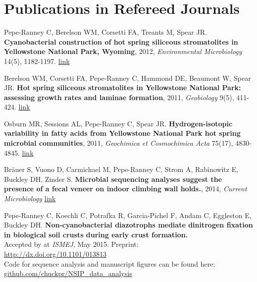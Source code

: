 \documentclass[letterpaper]{article}
\renewenvironment{itemize}{
  \begin{list}{}{
    \setlength{\leftmargin}{1.5em}
  }
}{
  \end{list}
}
\begin{document}
\section*{Publications in Refereed Journals}
\begin{itemize}
\item Pepe-Ranney C, Berelson WM, Corsetti FA, Treants M, Spear JR.
    \textbf{Cyanobacterial construction of hot spring siliceous stromatolites in
    Yellowstone National Park, Wyoming}, 2012, {\it Environmental
    Microbiology} 14(5), 1182-1197. \href{http://www.ncbi.nlm.nih.gov/pubmed/22356555}{link} 
\item Berelson WM, Corsetti FA, Pepe-Ranney C, Hammond DE, Beaumont W, Spear
    JR. \textbf{Hot spring siliceous stromatolites in Yellowstone National Park:
    assessing growth rates and laminae formation}, 2011, {\it Geobiology}
    9(5), 411-424. \href{http://www.ncbi.nlm.nih.gov/pubmed/21777367}{link}
\item Osburn MR, Sessions AL, Pepe-Ranney C, Spear JR. \textbf{Hydrogen-isotopic
    variability in fatty acids from Yellowstone National Park hot spring
    microbial communities}, 2011, {\it Geochimica et Cosmochimica Acta}
    75(17), 4830-4845.
    \href{http://www.sciencedirect.com/science/article/pii/S0016703711003152}{link}
\item Br\"{a}uer S, Vuono D, Carmichael M, Pepe-Ranney C, Strom A, Rabinowitz
    E, Buckley DH, Zinder S. \textbf{Microbial sequencing analyses suggest
    the presence of a fecal veneer on indoor climbing wall holds.}, 2014, {\it
    Current Microbiology} \href{http://www.ncbi.nlm.nih.gov/pubmed/24972665}{link}
\item Pepe-Ranney C, Koechli C, Potrafka R, Garcia-Pichel F, Andam C, Eggleston E, Buckley DH. 
    \textbf{Non-cyanobacterial diazotrophs mediate dinitrogen fixation in
        biological soil crusts during early crust formation.}\\ 
    Accepted by at \textit{ISMEJ}, May 2015. Preprint:\\ 
    \href{http://dx.doi.org/10.1101/013813}
    {http://dx.doi.org/10.1101/013813}\\
    Code for sequence analysis and manuscript figures can be found here:\\
    \href{http://www.github.com/chuckpr/NSIP_data_analysis}
    {github.com/chuckpr/NSIP\_data\_analysis}
\end{itemize}
\end{document}
